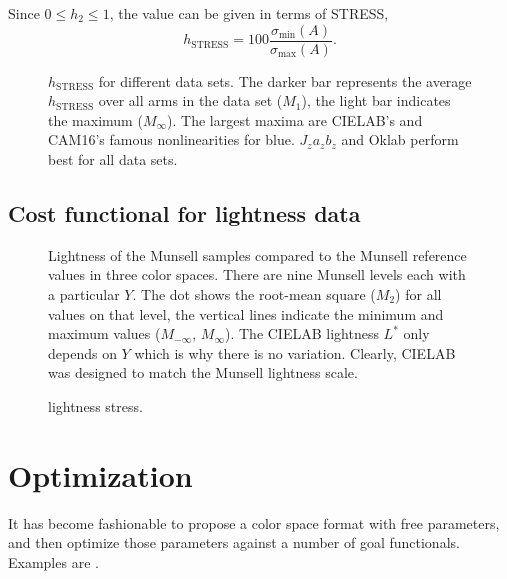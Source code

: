 \documentclass{scrartcl}
\newtheorem*{remark}{Remark}
\theoremstyle{named}
\begin{document}
Since $0\le h_2\le 1$, the value can be given in terms of STRESS,
\begin{equation}\label{eq:hstress}
  h_\text{STRESS} = 100 \frac{\sigma_{\min}(A)}{\sigma_{\max}(A)}.
\end{equation}




\begin{figure}
  \centering
  
  \caption{$h_\text{STRESS}$ for different data sets. The darker bar represents the
  average $h_\text{STRESS}$ over all arms in the data set ($M_1$), the light bar
  indicates the maximum ($M_{\infty}$).  The largest maxima are CIELAB's and CAM16's
  famous nonlinearities for blue.
  $J_za_zb_z$ and Oklab perform best for all data sets.}
  \label{fig:hstress}
\end{figure}

\subsection{Cost functional for lightness data}

\begin{figure}
  \centering
  
  \hfill
  
  \hfill
  
  \caption{Lightness of the Munsell samples compared to the Munsell reference values in
  three color spaces.
  There are nine Munsell levels each with a particular $Y$.
  The dot shows the root-mean square ($M_2$) for all values on that level, the
  vertical lines indicate the minimum and maximum values ($M_{-\infty}$, $M_{\infty}$).
  The CIELAB lightness $L^*$ only depends on $Y$ which is why there is no variation.
  Clearly, CIELAB was designed to match the Munsell lightness scale.}
\end{figure}

\begin{figure}
  \centering
  
  \caption{lightness stress.}
\end{figure}


\cite{munsell}
\cite{fairchildchen}

\section{Optimization}

It has become fashionable to propose a color space format with free parameters, and then
optimize those parameters against a number of goal functionals. Examples are
\cite{prolab,oklab,jzazbz}.


{}

\end{document}
